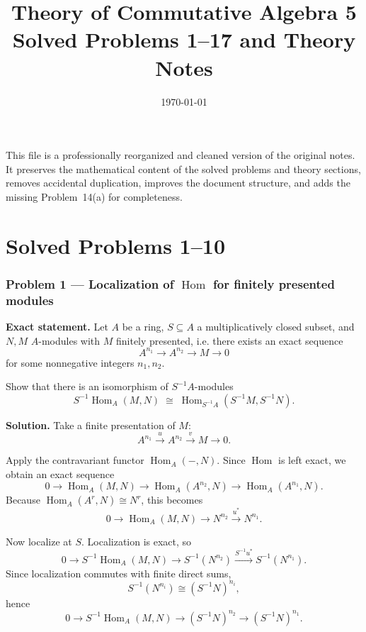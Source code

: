 \documentclass[12pt,a4paper]{article}
\title{\vspace{-1.5em}\bfseries Theory of Commutative Algebra 5\\[0.4em]\large Solved Problems 1--17 and Theory Notes}
\author{}
\date{\today}
\theoremstyle{notespace}
\begin{document}
\maketitle
\thispagestyle{fancy}

\begin{center}
\begin{minipage}{0.92\textwidth}
This file is a professionally reorganized and cleaned version of the original notes. It preserves the mathematical content of the solved problems and theory sections, removes accidental duplication, improves the document structure, and adds the missing Problem~14(a) for completeness.
\end{minipage}
\end{center}

\tableofcontents
\clearpage
\part{Solved Problems 1--10}

\section{Problem 1 --- Localization of \texorpdfstring{$\operatorname{Hom}$}{Hom} for finitely presented modules}

\textbf{Exact statement.}
Let \(A\) be a ring, \(S \subseteq A\) a multiplicatively closed subset, and \(N,M\) \(A\)-modules with \(M\) finitely presented, i.e. there exists an exact sequence
\[
A^{n_1}\longrightarrow A^{n_2}\longrightarrow M\longrightarrow 0
\]
for some nonnegative integers \(n_1,n_2\).

Show that there is an isomorphism of \(S^{-1}A\)-modules
\[
S^{-1}\!\operatorname{Hom}_A(M,N)\;\cong\;\operatorname{Hom}_{S^{-1}A}(S^{-1}M,S^{-1}N).
\]

\textbf{Solution.}
Take a finite presentation of \(M\):
\[
A^{n_1}\xrightarrow{u} A^{n_2}\xrightarrow{v} M\to 0.
\]

Apply the contravariant functor \(\operatorname{Hom}_A(-,N)\). Since \(\operatorname{Hom}\) is left exact, we obtain an exact sequence
\[
0\to \operatorname{Hom}_A(M,N)\to \operatorname{Hom}_A(A^{n_2},N)\to \operatorname{Hom}_A(A^{n_1},N).
\]
Because \(\operatorname{Hom}_A(A^r,N)\cong N^r\), this becomes
\[
0\to \operatorname{Hom}_A(M,N)\to N^{n_2}\xrightarrow{u^*} N^{n_1}.
\]

Now localize at \(S\). Localization is exact, so
\[
0\to S^{-1}\operatorname{Hom}_A(M,N)\to S^{-1}(N^{n_2})\xrightarrow{S^{-1}u^*} S^{-1}(N^{n_1}).
\]
Since localization commutes with finite direct sums,
\[
S^{-1}(N^{n_i})\cong (S^{-1}N)^{n_i},
\]
hence
\[
0\to S^{-1}\operatorname{Hom}_A(M,N)\to (S^{-1}N)^{n_2}\to (S^{-1}N)^{n_1}.
\]
\end{document}
